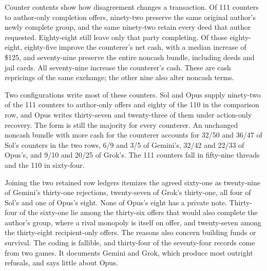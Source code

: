 
Counter contents show how disagreement changes a transaction. Of 111 counters to author-only completion offers, ninety-two preserve the same original author's newly complete group, and the same ninety-two retain every deed that author requested. Eighty-eight still leave only that party completing. Of those eighty-eight, eighty-five improve the counterer's net cash, with a median increase of \$125, and seventy-nine preserve the entire noncash bundle, including deeds and jail cards. All seventy-nine increase the counterer's cash. These are cash repricings of the same exchange; the other nine also alter noncash terms.

Two configurations write most of these counters. Sol and Opus supply ninety-two of the 111 counters to author-only offers and eighty of the 110 in the comparison row, and Opus writes thirty-seven and twenty-three of them under action-only recovery. The form is still the majority for every counterer. An unchanged noncash bundle with more cash for the counterer accounts for 32/50 and 36/47 of Sol's counters in the two rows, 6/9 and 3/5 of Gemini's, 32/42 and 22/33 of Opus's, and 9/10 and 20/25 of Grok's. The 111 counters fall in fifty-nine threads and the 110 in sixty-four.


Joining the two retained row ledgers itemizes the agreed sixty-one as twenty-nine of Gemini's thirty-one rejections, twenty-seven of Grok's thirty-one, all four of Sol's and one of Opus's eight. None of Opus's eight has a private note. Thirty-four of the sixty-one lie among the thirty-six offers that would also complete the author's group, where a rival monopoly is itself on offer, and twenty-seven among the thirty-eight recipient-only offers. The reasons also concern building funds or survival. The coding is fallible, and thirty-four of the seventy-four records come from two games. It documents Gemini and Grok, which produce most outright refusals, and says little about Opus.

